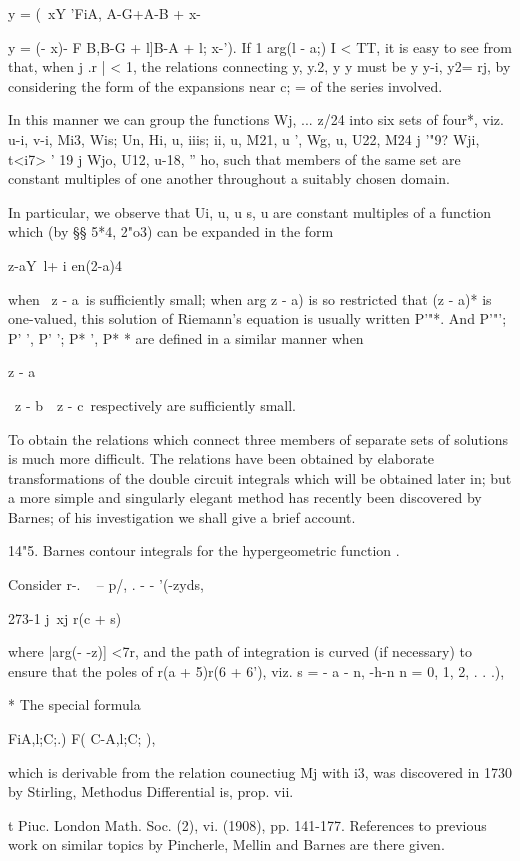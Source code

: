 y = (\ xY 'FiA, A-G+\;A-B + \; x-%

y = (- x)- F B,B-G + l]B-A + l; x-'). If 1 arg(l - a;) I < TT, it is
easy to see from that, when j .r | < 1, the relations
connecting y, y.2, y y must be y y-i, y2= rj, by considering the
form of the expansions near c; = of the series involved.

In this manner we can group the functions Wj, ... z/24 into six sets
of four*, viz. u-i, v-i, Mi3, Wis; Un, Hi, u, iiis; ii, u, M21, u
', Wg, u, U22, M24 j '"9? Wji, t<i7> ' 19 j Wjo, U12, u-18, '' ho,
such that members of the same set are constant multiples of one
another throughout a suitably chosen domain.

In particular, we observe that Ui, u, u s, u are constant multiples
of a function which (by §§ 5*4, 2"o3) can be expanded in the form

 z-aY\ l+ i en(2-a)4

when \ z - a\ is sufficiently small; when arg z - a) is so restricted
that (z - a)* is one-valued, this solution of Riemann's equation is
usually written P'"*. And P'"'; P' ', P' '; P* ', P* * are defined in
a similar manner when

z - a

\ z - b\, \ z - c\ respectively are sufficiently small.

To obtain the relations which connect three members of separate sets
of solutions is much more difficult. The relations have been obtained
by elaborate transformations of the double circuit integrals which
will be obtained later in; but a more simple and singularly
elegant method has recently been discovered by Barnes; of his
investigation we shall give a brief account.

14"5. Barnes contour integrals for the hypergeometric function .

Consider r-. ~ -- p/, . - - '(-zyds,

273-1 j\ xj r(c + s)

where |arg(- -z)] <7r, and the path of integration is curved (if
necessary) to ensure that the poles of r(a + 5)r(6 + 6'), viz. s = - a
- n, -h-n n = 0, 1, 2, . . .),

* The special formula

FiA,l;C;.) F( C-A,l;C; ),

which is derivable from the relation counectiug Mj with i3, was
discovered in 1730 by Stirling, Methodus Differential is, prop. vii.

t Piuc. London Math. Soc. (2), vi. (1908), pp. 141-177. References to
previous work on similar topics by Pincherle, Mellin and Barnes are
there given.

